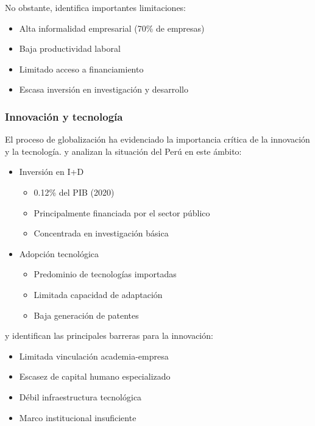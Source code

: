 \documentclass[12pt, a4paper]{article}
\begin{document}
No obstante, \textcite{villarreal2019} identifica importantes limitaciones:
\begin{itemize}
    \item Alta informalidad empresarial (70\% de empresas)
    \item Baja productividad laboral
    \item Limitado acceso a financiamiento
    \item Escasa inversión en investigación y desarrollo
\end{itemize}

\subsubsection{Innovación y tecnología}
El proceso de globalización ha evidenciado la importancia crítica de la innovación y la tecnología. \textcite{kuramoto2018} y \textcite{sagasti2020} analizan la situación del Perú en este ámbito:

\begin{itemize}
    \item Inversión en I+D
    \begin{itemize}
        \item 0.12\% del PIB (2020)
        \item Principalmente financiada por el sector público
        \item Concentrada en investigación básica
    \end{itemize}
    
    \item Adopción tecnológica
    \begin{itemize}
        \item Predominio de tecnologías importadas
        \item Limitada capacidad de adaptación
        \item Baja generación de patentes
    \end{itemize}
\end{itemize}

\textcite{peters2021} y \textcite{martinez2020} identifican las principales barreras para la innovación:
\begin{itemize}
    \item Limitada vinculación academia-empresa
    \item Escasez de capital humano especializado
    \item Débil infraestructura tecnológica
    \item Marco institucional insuficiente
\end{itemize}
\end{document}
